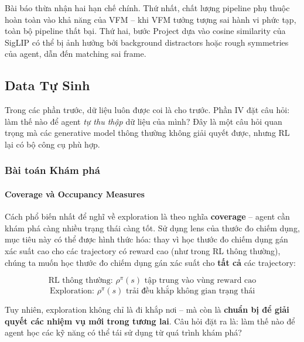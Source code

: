 Bài báo thừa nhận hai hạn chế chính. Thứ nhất, chất lượng pipeline
phụ thuộc hoàn toàn vào khả năng của VFM -- khi VFM tưởng tượng sai
hành vi phức tạp, toàn bộ pipeline thất bại. Thứ hai, bước Project
dựa vào cosine similarity của SigLIP có thể bị ảnh hưởng bởi
background distractors hoặc rough symmetries của agent, dẫn đến
matching sai frame.

\subsection{Data Tự Sinh}

Trong các phần trước, dữ liệu luôn được coi là cho trước. Phần IV đặt
câu hỏi: làm thế nào để agent \textit{tự thu thập} dữ liệu của mình?
Đây là một câu hỏi quan trọng mà các generative model thông thường
không giải quyết được, nhưng RL lại có bộ công cụ phù hợp.

\subsubsection{Bài toán Khám phá}

\paragraph{Coverage và Occupancy Measures}

Cách phổ biến nhất để nghĩ về exploration là theo nghĩa
\textbf{coverage} -- agent cần khám phá càng nhiều trạng thái càng
tốt. Sử dụng lens của thước đo chiếm dụng, mục tiêu này có thể được
hình thức hóa: thay vì học thước đo chiếm dụng gán xác suất cao cho
các trajectory có reward cao (như trong RL thông thường), chúng ta
muốn học thước đo chiếm dụng gán xác suất cho \textbf{tất cả} các
trajectory:

\[
\text{RL thông thường: } \rho^\pi(s) \text{ tập trung vào vùng
reward cao}
\]
\[
\text{Exploration: } \rho^\pi(s) \text{ trải đều khắp không gian
trạng thái}
\]

Tuy nhiên, exploration không chỉ là đi khắp nơi -- mà còn là
\textbf{chuẩn bị để giải quyết các nhiệm vụ mới trong tương lai}. Câu
hỏi đặt ra là: làm thế nào để agent học các kỹ năng có thể tái sử
dụng từ quá trình khám phá?



